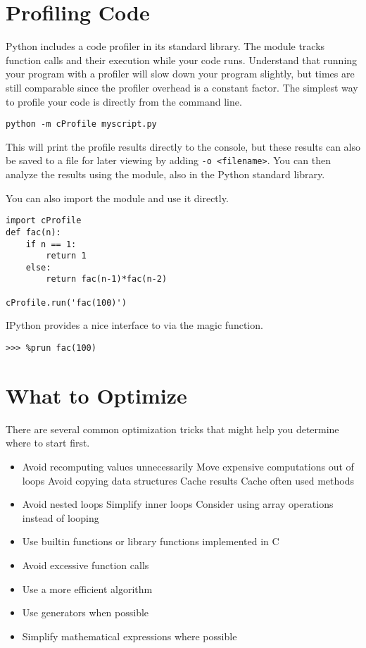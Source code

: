 \section*{Profiling Code}
Python includes a code profiler in its standard library. 
The  module tracks function calls and their execution while your code runs.
Understand that running your program with a profiler will slow down your program slightly, but times are still comparable since the profiler overhead is a constant factor.
The simplest way to profile your code is directly from the command line.
\begin{lstlisting}
python -m cProfile myscript.py
\end{lstlisting}
This will print the profile results directly to the console, but these results can also be saved to a file for later viewing by adding \texttt{-o <filename>}.
You can then analyze the results using the  module, also in the Python standard library.

You can also import the  module and use it directly.
\begin{lstlisting}
import cProfile
def fac(n):
    if n == 1:
        return 1
    else:
        return fac(n-1)*fac(n-2)

cProfile.run('fac(100)')
\end{lstlisting}

IPython provides a nice interface to  via the  magic function.
\begin{lstlisting}
>>> %prun fac(100)
\end{lstlisting}


\section*{What to Optimize}
There are several common optimization tricks that might help you determine where to start first.
\begin{itemize}
\item Avoid recomputing values unnecessarily
    \subitem Move expensive computations out of loops
    \subitem Avoid copying data structures
    \subitem Cache results
    \subitem Cache often used methods
\item Avoid nested loops
    \subitem Simplify inner loops
    \subitem Consider using array operations instead of looping
\item Use builtin functions or library functions implemented in C
\item Avoid excessive function calls
\item Use a more efficient algorithm
\item Use generators when possible
\item Simplify mathematical expressions where possible
\end{itemize}

